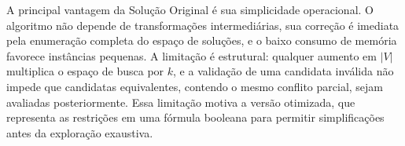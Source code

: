 A principal vantagem da Solução Original é sua simplicidade operacional. O algoritmo não depende de transformações intermediárias, sua correção é imediata pela enumeração completa do espaço de soluções, e o baixo consumo de memória favorece instâncias pequenas. A limitação é estrutural: qualquer aumento em $|V|$ multiplica o espaço de busca por $k$, e a validação de uma candidata inválida não impede que candidatas equivalentes, contendo o mesmo conflito parcial, sejam avaliadas posteriormente. Essa limitação motiva a versão otimizada, que representa as restrições em uma fórmula booleana para permitir simplificações antes da exploração exaustiva.
